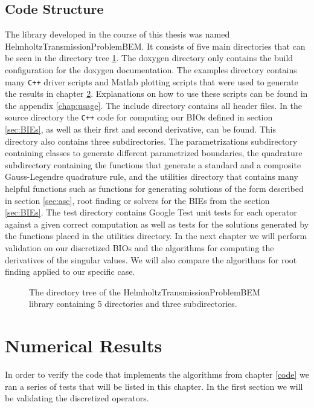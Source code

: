 \documentclass[a4paper, oneside]{thirdparty_stylesheets/discothesis}
\begin{document}
\section{Code Structure}
The library developed in the course of this thesis was named HelmholtzTransmissionProblemBEM.
It consists of five main directories that can be seen in the directory tree \ref{dir:struct}.
The doxygen directory only contains the build configuration for the doxygen documentation.
The examples directory contains many \texttt{C++} driver scripts and Matlab plotting scripts that were used to generate the results in chapter \ref{chap:numres}.
Explanations on how to use these scripts can be found in the appendix \ref{chap:usage}.
The include directory contains all header files.
In the source directory the \texttt{C++} code for computing our BIOs defined in section \ref{sec:BIEs}, as well as their first and second derivative, can be found.
This directory also contains three subdirectories.
The parametrizations subdirectory containing classes to generate different parametrized boundaries, the quadrature subdirectory containing the functions that generate a standard and a composite Gauss-Legendre quadrature rule, and the utilities directory that contains many helpful functions such as functions for generating solutions of the form described in section \ref{sec:asc}, root finding or solvers for the BIEs from the section \ref{sec:BIEs}.
The test directory contains Google Test unit tests for each operator against a given correct computation as well as tests for the solutions generated by the functions placed in the utilities directory.
In the next chapter we will perform validation on our discretized BIOs and the algorithms for computing the derivatives of the singular values.
We will also compare the algorithms for root finding applied to our specific case.
\begin{figure}[H]
	\centering
	\caption{The directory tree of the HelmholtzTransmissionProblemBEM library containing 5 directories and three subdirectories.} 
	\label{dir:struct}
\end{figure}

\chapter{Numerical Results} \label{chap:numres}
In order to verify the code that implements the algorithms from chapter \ref{code} we ran a series of tests that will be listed in this chapter. 
In the first section we will be validating the discretized operators.
\end{document}
